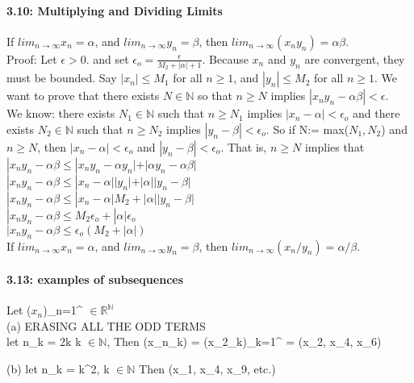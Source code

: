 \documentclass[10pt,letter]{article}
\begin{document}
\paragraph{3.10: Multiplying and Dividing Limits}
If $lim_{n\rightarrow\infty}x_n = \alpha$, and $lim_{n\rightarrow\infty}y_n = \beta$, then $lim_{n\rightarrow\infty}(x_ny_n) = \alpha\beta$.\\
Proof: Let $\epsilon > 0$. and set $\epsilon_o = \frac{\epsilon}{M_2 +|\alpha| + 1}$. Because $x_n$ and $y_n$ are convergent, they must be bounded. Say $|x_n| \leq M_1$ for all $n \geq 1$, and $|y_n| \leq M_2$ for all $n \geq 1$. We want to prove that there exists $N \in \mathbb{N}$ so that $n \geq N$ implies $|x_ny_n - \alpha\beta| < \epsilon$.\\ 
We know: there exists $N_1 \in \mathbb{N}$ such that $n \geq N_1$ implies $|x_n - \alpha| < \epsilon_o$ and there exists $N_2 \in \mathbb{N}$ such that $n \geq N_2$ implies $|y_n - \beta| < \epsilon_o$. So if N:= max($N_1,N_2$) and $n \geq N$, then $|x_n - \alpha| < \epsilon_o$ and $|y_n - \beta| < \epsilon_o$. That is, $n \geq N$ implies that \\ 
$|x_ny_n - \alpha\beta \leq |x_ny_n - \alpha y_n| + |\alpha y_n - \alpha\beta|$ \\ 
$|x_ny_n - \alpha\beta \leq |x_n - \alpha||y_n| + |\alpha||y_n - \beta|$ \\ 
$|x_ny_n - \alpha\beta \leq |x_n - \alpha|M_2 + |\alpha||y_n - \beta|$\\ 
$|x_ny_n - \alpha\beta \leq M_2\epsilon_o + |\alpha|\epsilon_o$ \\ 
$|x_ny_n - \alpha\beta \leq \epsilon_o(M_2 + |\alpha|)$ \\ 

If $lim_{n\rightarrow\infty}x_n = \alpha$, and $lim_{n\rightarrow\infty}y_n = \beta$, then $lim_{n\rightarrow\infty}(x_n/y_n) = \alpha/\beta$.

\paragraph{3.13: examples of subsequences}
Let ($x_n$)_{n=1}^{\infty} $\in \mathbb{R}^\mathbb{N}$\\

(a) ERASING ALL THE ODD TERMS\\
let n_k = 2k k $\in \mathbb{N}$, Then (x_{n_k}) = (x_{2_k})_{k=1}^{\infty} = (x_2, x_4, x_6)

(b) let n_k = k^2, k $\in \mathbb{N}$ Then (x_1, x_4, x_9, etc.)
\end{document}
